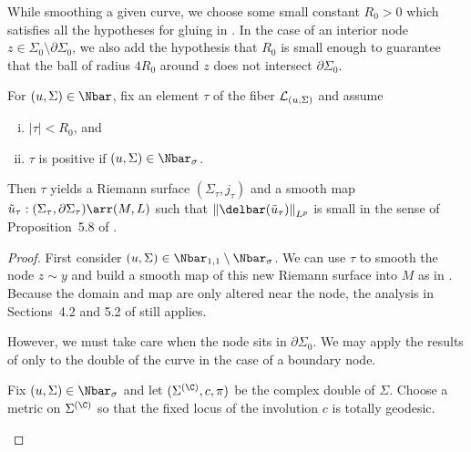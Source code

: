While smoothing a given curve, we choose some small constant $R_0>0$ which satisfies all the hypotheses for gluing in \cite{dw}. In the case of an interior node $z \in \Sigma_0 \setminus \partial\Sigma_0$, we also add the hypothesis that $R_0$ is small enough to guarantee that the ball of radius $4R_0$ around $z$ does not intersect $\partial\Sigma_0$.

\begin{lemma} \label{glue11}
For $(u,\Sigma) \in \Nbar$, fix an element $\tau$ of the fiber $\mathcal{L}_{(u,\Sigma)}$ and assume
\begin{enumerate}[(i)]
\item $|\tau|<R_0$, and
\item $\tau$ is positive if $(u,\Sigma) \in \Nbar_\sigma$.
\end{enumerate}
Then $\tau$ yields a Riemann surface $(\Sigma_\tau,j_\tau)$ and a smooth map $\tilde{u}_\tau:(\Sigma_\tau,\partial\Sigma_\tau) \arr (M,L)$ such that $\norm{\delbar(\tilde{u}_\tau)}_{L^p}$ is small in the sense of Proposition~5.8 of \cite{dw}.
\begin{proof}
First consider $(u,\Sigma) \in \Nbar_{1,1} \setminus \Nbar_\sigma$. We can use $\tau$ to smooth the node $z \sim y$ and build a smooth map of this new Riemann surface into $M$ as in \cite{dw}. Because the domain and map are only altered near the node, the analysis in Sections~4.2 and 5.2 of \cite{dw} still applies.

However, we must take care when the node sits in $\partial\Sigma_0$. We may apply the results of \cite{dw} only to the double of the curve in the case of a boundary node.

Fix $(u,\Sigma) \in \Nbar_\sigma$ and let $(\Sigma^{(\C)},c,\pi)$ be the complex double of $\Sigma$. Choose a metric on $\Sigma^{(\C)}$ so that the fixed locus of the involution $c$ is totally geodesic.
\begin{figure}[ht]
\centering
{}
\end{figure}
\end{proof}
\end{lemma}

